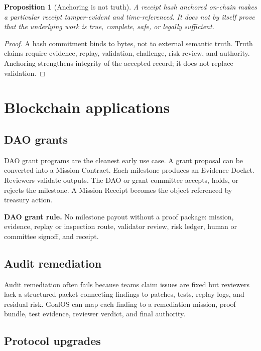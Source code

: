 \documentclass[11pt]{article}
\newtheorem{proposition}{Proposition}[section]
\begin{document}
\begin{proposition}[Anchoring is not truth]
A receipt hash anchored on-chain makes a particular receipt tamper-evident and time-referenced. It does not by itself prove that the underlying work is true, complete, safe, or legally sufficient.
\end{proposition}

\begin{proof}
A hash commitment binds to bytes, not to external semantic truth. Truth claims require evidence, replay, validation, challenge, risk review, and authority. Anchoring strengthens integrity of the accepted record; it does not replace validation.
\end{proof}

\section{Blockchain applications}

\subsection{DAO grants}

DAO grant programs are the cleanest early use case. A grant proposal can be converted into a Mission Contract. Each milestone produces an Evidence Docket. Reviewers validate outputs. The DAO or grant committee accepts, holds, or rejects the milestone. A Mission Receipt becomes the object referenced by treasury action.

\begin{standardbox}
\textbf{DAO grant rule.} No milestone payout without a proof package: mission, evidence, replay or inspection route, validator review, risk ledger, human or committee signoff, and receipt.
\end{standardbox}

\subsection{Audit remediation}

Audit remediation often fails because teams claim issues are fixed but reviewers lack a structured packet connecting findings to patches, tests, replay logs, and residual risk. GoalOS can map each finding to a remediation mission, proof bundle, test evidence, reviewer verdict, and final authority.

\subsection{Protocol upgrades}
\end{document}
